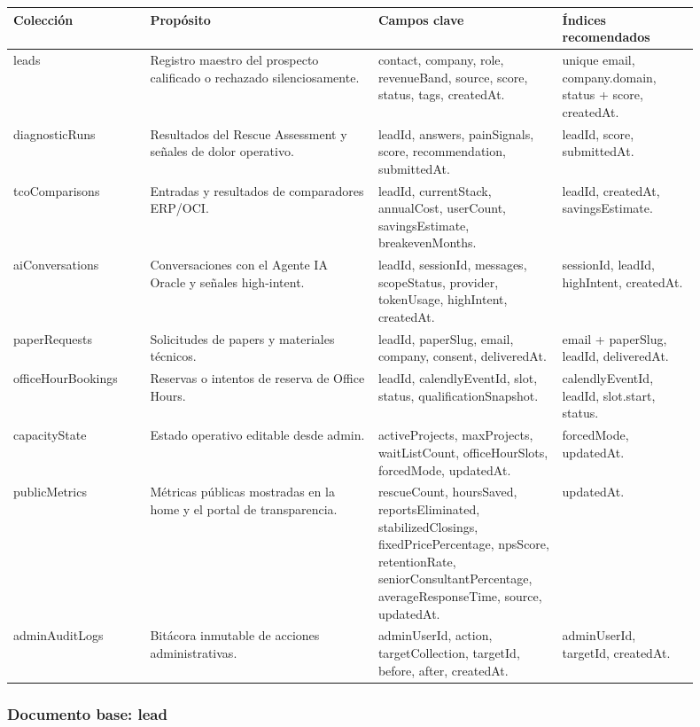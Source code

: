 \documentclass[11pt,letterpaper]{article}
\begin{document}
\begin{longtable}{p{0.18\linewidth}p{0.30\linewidth}p{0.24\linewidth}p{0.18\linewidth}}
\toprule
\textbf{Colección} & \textbf{Propósito} & \textbf{Campos clave} & \textbf{Índices recomendados} \\
\midrule
leads & Registro maestro del prospecto calificado o rechazado silenciosamente. & contact, company, role, revenueBand, source, score, status, tags, createdAt. & unique email, company.domain, status + score, createdAt. \\
diagnosticRuns & Resultados del Rescue Assessment y señales de dolor operativo. & leadId, answers, painSignals, score, recommendation, submittedAt. & leadId, score, submittedAt. \\
tcoComparisons & Entradas y resultados de comparadores ERP/OCI. & leadId, currentStack, annualCost, userCount, savingsEstimate, breakevenMonths. & leadId, createdAt, savingsEstimate. \\
aiConversations & Conversaciones con el Agente IA Oracle y señales high-intent. & leadId, sessionId, messages, scopeStatus, provider, tokenUsage, highIntent, createdAt. & sessionId, leadId, highIntent, createdAt. \\
paperRequests & Solicitudes de papers y materiales técnicos. & leadId, paperSlug, email, company, consent, deliveredAt. & email + paperSlug, leadId, deliveredAt. \\
officeHourBookings & Reservas o intentos de reserva de Office Hours. & leadId, calendlyEventId, slot, status, qualificationSnapshot. & calendlyEventId, leadId, slot.start, status. \\
capacityState & Estado operativo editable desde admin. & activeProjects, maxProjects, waitListCount, officeHourSlots, forcedMode, updatedAt. & forcedMode, updatedAt. \\
publicMetrics & Métricas públicas mostradas en la home y el portal de transparencia. & rescueCount, hoursSaved, reportsEliminated, stabilizedClosings, fixedPricePercentage, npsScore, retentionRate, seniorConsultantPercentage, averageResponseTime, source, updatedAt. & updatedAt. \\
adminAuditLogs & Bitácora inmutable de acciones administrativas. & adminUserId, action, targetCollection, targetId, before, after, createdAt. & adminUserId, targetId, createdAt. \\
\bottomrule
\end{longtable}

\subsubsection{Documento base: lead}
\end{document}
